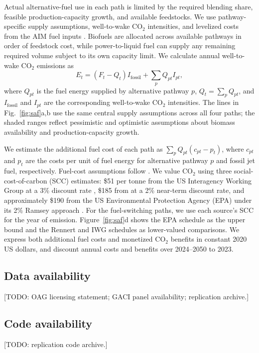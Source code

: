 \documentclass[12pt]{extarticle}
\begin{document}
Actual alternative-fuel use in each path is limited by the required blending share, feasible production-capacity growth, and available feedstocks. We use pathway-specific supply assumptions, well-to-wake CO$_2$ intensities, and levelized costs from the AIM fuel inputs \citep{dray2019aim2015,dray2022}. Biofuels are allocated across available pathways in order of feedstock cost, while power-to-liquid fuel can supply any remaining required volume subject to its own capacity limit. We calculate annual well-to-wake CO$_2$ emissions as
\begin{equation}
E_t=(F_t-Q_t)I_{\mathrm{fossil}}+\sum_p Q_{pt}I_{pt},
\end{equation}
where $Q_{pt}$ is the fuel energy supplied by alternative pathway $p$, $Q_t=\sum_p Q_{pt}$, and $I_{\mathrm{fossil}}$ and $I_{pt}$ are the corresponding well-to-wake CO$_2$ intensities. The lines in Fig.~\ref{fig:saf}a,b use the same central supply assumptions across all four paths; the shaded ranges reflect pessimistic and optimistic assumptions about biomass availability and production-capacity growth.

We estimate the additional fuel cost of each path as $\sum_p Q_{pt}(c_{pt}-p_t)$, where $c_{pt}$ and $p_t$ are the costs per unit of fuel energy for alternative pathway $p$ and fossil jet fuel, respectively. Fuel-cost assumptions follow \citet{dray2022}. We value CO$_2$ using three social-cost-of-carbon (SCC) estimates: \$51 per tonne from the US Interagency Working Group at a 3\% discount rate \citep{iwg2021}, \$185 from \citet{rennert2022} at a 2\% near-term discount rate, and approximately \$190 from the US Environmental Protection Agency (EPA) under its 2\% Ramsey approach \citep{epa2023}.  For the fuel-switching paths, we use each source's SCC for the year of emission. Figure~\ref{fig:saf}d shows the EPA schedule as the upper bound and the Rennert and IWG schedules as lower-valued comparisons. We express both additional fuel costs and monetized CO$_2$ benefits in constant 2020 US dollars, and discount annual costs and benefits over 2024--2050 to 2023.

\subsection*{Data availability}
[TODO: OAG licensing statement; GACI panel availability; replication
archive.]

\subsection*{Code availability}
[TODO: replication code archive.]
\end{document}
